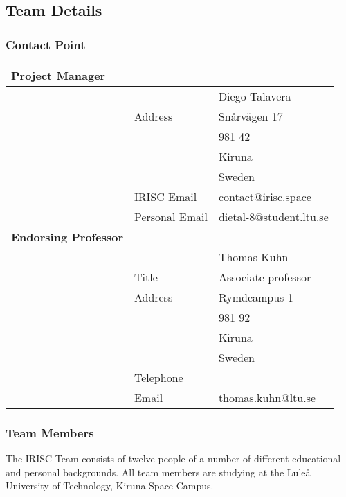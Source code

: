\subsection{Team Details}
\subsubsection{Contact Point}


\begin{tabular}{m{} m{} m{}}
	\textbf{Project Manager} & & \\	\hline
	 & & Diego Talavera \\
	 & Address & Snårvägen 17 \\
	 & & 981 42 \\
	 & & Kiruna \\
	 & & Sweden \\ 
	 & IRISC Email & contact@irisc.space \\
	 & Personal Email & dietal-8@student.ltu.se\\
	 \textbf{Endorsing Professor} & & \\ \hline
	 & & Thomas Kuhn \\
	 & Title & Associate professor \\
	 & Address & Rymdcampus 1 \\
	 & &  981 92 \\
	 & & Kiruna \\
	 & & Sweden \\
	 & Telephone & \\
	 & Email & thomas.kuhn@ltu.se \\

\end{tabular}

\subsubsection{Team Members}
The IRISC Team consists of twelve people of a number of different educational and personal backgrounds. All team members are studying at the Lule{\aa} University of Technology, Kiruna Space Campus. 

\bigskip

